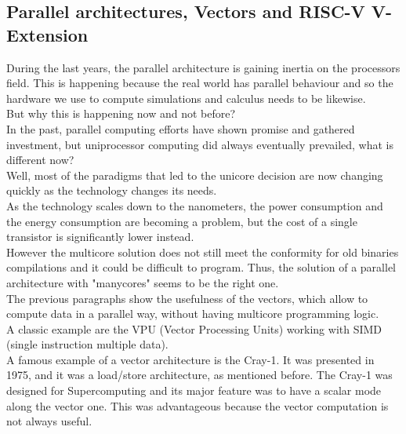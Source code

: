 \subsection{Parallel architectures, Vectors and RISC-V V-Extension}
During the last years, the parallel architecture is gaining inertia on the processors field. This is happening because the real world has parallel behaviour and so the hardware we use to compute simulations and calculus needs to be likewise.\cite{Parallel-Computing}\\
But why this is happening now and not before?\\
In the past, parallel computing efforts have shown promise and gathered investment, but uniprocessor computing did always eventually prevailed, what is different now?\\
Well, most of the paradigms that led to the unicore decision are now changing quickly as the technology changes its needs.\\
As the technology scales down to the nanometers, the power consumption and the energy consumption are becoming a problem, but the cost of a single transistor is significantly lower instead.\\

However the multicore solution does not still meet the conformity for old binaries compilations and it could be difficult to program. Thus, the solution of a parallel architecture with "manycores" seems to be the right one.\\

The previous paragraphs show the usefulness of the vectors, which allow to compute data in a parallel way, without having multicore programming logic.\\
A classic example are the VPU (Vector Processing Units) working with SIMD (single instruction multiple data).\\

A famous example of a vector architecture is the Cray-1. It was presented in 1975, and it was a load/store architecture, as mentioned before.
The Cray-1 was designed for Supercomputing and its major feature was to have a scalar mode along the vector one. This was advantageous because the vector computation is not always useful.\\

